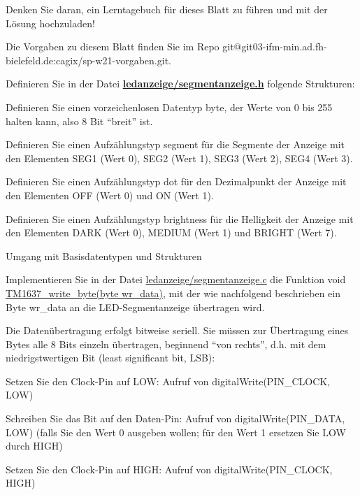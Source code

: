 Denken Sie daran, ein Lerntagebuch für dieses Blatt zu führen und mit der Lösung hochzuladen!

Die Vorgaben zu diesem Blatt finden Sie im Repo {\ttfamily git@git03-\/ifm-\/min.\+ad.\+fh-\/bielefeld.\+de\+:cagix/sp-\/w21-\/vorgaben.\+git.}

Definieren Sie in der Datei {\bfseries \hyperlink{segmentanzeige_8h}{ledanzeige/segmentanzeige.\+h}} folgende Strukturen\+:


\begin{DoxyEnumerate}
\item Definieren Sie einen vorzeichenlosen Datentyp byte, der Werte von 0 bis 255 halten kann, also 8 Bit “breit” ist.
\item Definieren Sie einen Aufzählungstyp segment für die Segmente der Anzeige mit den Elementen S\+E\+G1 (Wert 0), S\+E\+G2 (Wert 1), S\+E\+G3 (Wert 2), S\+E\+G4 (Wert 3).
\item Definieren Sie einen Aufzählungstyp dot für den Dezimalpunkt der Anzeige mit den Elementen O\+FF (Wert 0) und ON (Wert 1).
\item Definieren Sie einen Aufzählungstyp brightness für die Helligkeit der Anzeige mit den Elementen D\+A\+RK (Wert 0), M\+E\+D\+I\+UM (Wert 1) und B\+R\+I\+G\+HT (Wert 7).
\end{DoxyEnumerate}

Umgang mit Basisdatentypen und Strukturen

Implementieren Sie in der Datei \hyperlink{segmentanzeige_8c}{ledanzeige/segmentanzeige.\+c} die Funktion void \hyperlink{segmentanzeige_8c_a09f1e0171b38b9abbb5d351364cfec71}{T\+M1637\+\_\+write\+\_\+byte(byte wr\+\_\+data)}, mit der wie nachfolgend beschrieben ein Byte wr\+\_\+data an die L\+E\+D-\/\+Segmentanzeige übertragen wird.

Die Datenübertragung erfolgt bitweise seriell. Sie müssen zur Übertragung eines Bytes alle 8 Bits einzeln übertragen, beginnend “von rechts”, d.\+h. mit dem niedrigstwertigen Bit (least significant bit, L\+SB)\+:


\begin{DoxyEnumerate}
\item Setzen Sie den Clock-\/\+Pin auf L\+OW\+: Aufruf von digital\+Write(\+P\+I\+N\+\_\+\+C\+L\+O\+C\+K, L\+O\+W)
\item Schreiben Sie das Bit auf den Daten-\/\+Pin\+: Aufruf von digital\+Write(\+P\+I\+N\+\_\+\+D\+A\+T\+A, L\+O\+W) (falls Sie den Wert 0 ausgeben wollen; für den Wert 1 ersetzen Sie L\+OW durch H\+I\+GH)
\item Setzen Sie den Clock-\/\+Pin auf H\+I\+GH\+: Aufruf von digital\+Write(\+P\+I\+N\+\_\+\+C\+L\+O\+C\+K, H\+I\+G\+H)
\end{DoxyEnumerate}

